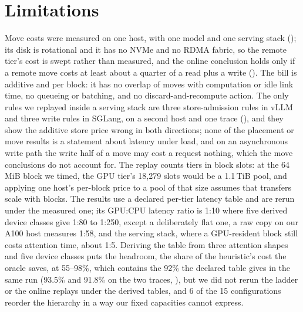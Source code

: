 \section{Limitations}
\label{sec:limits}
Move costs were measured on one host, with one model and one serving stack (); its disk is
rotational and it has no NVMe and no RDMA fabric, so the remote tier's cost is swept rather than measured,
and the online conclusion holds only if a remote move costs at least about a quarter of a read plus a write
(). The bill is additive and per block: it has no overlap of moves with computation or
idle link time, no queueing or batching, and no discard-and-recompute action. The only rules we replayed inside a serving
stack are three store-admission rules in vLLM and three write rules in SGLang, on a second host and one trace
(), and they show the additive store price wrong in both directions; none of the placement or move results is a statement about latency
under load, and on an asynchronous write path the write half of a move may cost a request nothing, which
the move conclusions do not account for. The replay counts tiers in block slots: at the 64\,MiB block we timed, the GPU tier's 18{,}279 slots
would be a 1.1\,TiB pool, and applying one host's per-block price to a pool of that size assumes that
transfers scale with blocks.
The results use a declared per-tier latency table and are rerun under the measured one; its GPU:CPU
latency ratio is 1:10 where five derived device classes give 1:80 to 1:250, except a deliberately flat one,
a raw copy on our A100 host measures 1:58, and the serving stack, where a GPU-resident block still costs
attention time, about 1:5. Deriving the table from three attention shapes and five device classes puts
the headroom, the share of the heuristic's cost the oracle saves, at 55--98\%, which contains the 92\% the
declared table gives in the same run (93.5\% and 91.8\% on the two traces, ), but we did
not rerun the ladder or the online replays under the derived tables, and 6 of the 15 configurations
reorder the hierarchy in a way our fixed capacities cannot express.

